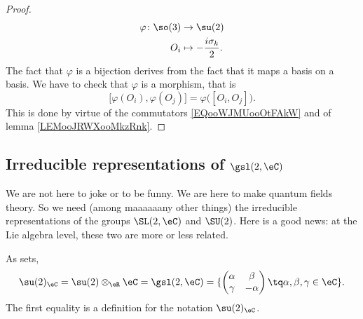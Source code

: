 \begin{proof}
\begin{equation}
\begin{aligned}
            \varphi\colon \so(3)&\to \su(2) \\
            O_i&\mapsto -\frac{ i\sigma_k }{ 2 }. 
        \end{aligned}
    \end{equation}
    The fact that \( \varphi\) is a bijection derives from the fact that it maps a basis on a basis. We have to check that \( \varphi\) is a morphism, that is
    \begin{equation}
        \big[ \varphi(O_i),\varphi(O_j) \big]=\varphi\big( [O_i,O_j] \big).
    \end{equation}
    This is done by virtue of the commutators \eqref{EQooWJMUooOtFAkW} and of lemma \ref{LEMooJRWXooMkzRnk}.
\end{proof}

\subsection{Irreducible representations of \texorpdfstring{$\gsl(2,\eC)$}{sl(2,C)}}

We are not here to joke or to be funny. We are here to make quantum fields theory. So we need (among maaaaaany other things) the irreducible representations of the groups \( \SL(2,\eC)\) and \( \SU(2)\). Here is a good news: at the Lie algebra level, these two are more or less related.

\begin{lemma}     \label{LEMooVEJZooUVNdmE}
    As sets,
    \begin{equation}
        \su(2)_{\eC}=\su(2)\otimes_{\eR}\eC=\gsl(2,\eC)=\{ \begin{pmatrix}
        \alpha    &   \beta    \\ 
    \gamma    &   -\alpha    
\end{pmatrix}\tq \alpha,\beta,\gamma\in \eC\}.
    \end{equation}
    The first equality is a definition for the notation \( \su(2)_{\eC}\).
\end{lemma}

